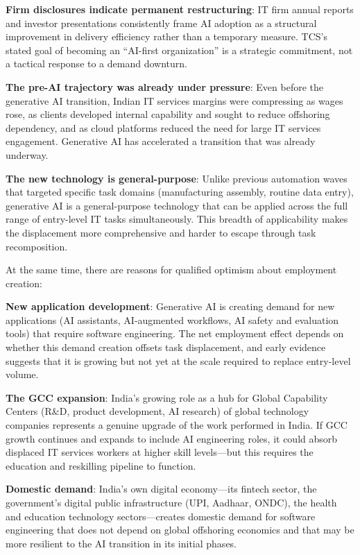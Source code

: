 \documentclass[conference]{IEEEtran}
\begin{document}
\textbf{Firm disclosures indicate permanent restructuring}: IT firm annual reports and investor presentations consistently frame AI adoption as a structural improvement in delivery efficiency rather than a temporary measure. TCS's stated goal of becoming an ``AI-first organization'' is a strategic commitment, not a tactical response to a demand downturn.

\textbf{The pre-AI trajectory was already under pressure}: Even before the generative AI transition, Indian IT services margins were compressing as wages rose, as clients developed internal capability and sought to reduce offshoring dependency, and as cloud platforms reduced the need for large IT services engagement. Generative AI has accelerated a transition that was already underway.

\textbf{The new technology is general-purpose}: Unlike previous automation waves that targeted specific task domains (manufacturing assembly, routine data entry), generative AI is a general-purpose technology that can be applied across the full range of entry-level IT tasks simultaneously. This breadth of applicability makes the displacement more comprehensive and harder to escape through task recomposition.

At the same time, there are reasons for qualified optimism about employment creation:

\textbf{New application development}: Generative AI is creating demand for new applications (AI assistants, AI-augmented workflows, AI safety and evaluation tools) that require software engineering. The net employment effect depends on whether this demand creation offsets task displacement, and early evidence suggests that it is growing but not yet at the scale required to replace entry-level volume.

\textbf{The GCC expansion}: India's growing role as a hub for Global Capability Centers (R\&D, product development, AI research) of global technology companies represents a genuine upgrade of the work performed in India. If GCC growth continues and expands to include AI engineering roles, it could absorb displaced IT services workers at higher skill levels---but this requires the education and reskilling pipeline to function.

\textbf{Domestic demand}: India's own digital economy---its fintech sector, the government's digital public infrastructure (UPI, Aadhaar, ONDC), the health and education technology sectors---creates domestic demand for software engineering that does not depend on global offshoring economics and that may be more resilient to the AI transition in its initial phases.
\end{document}
